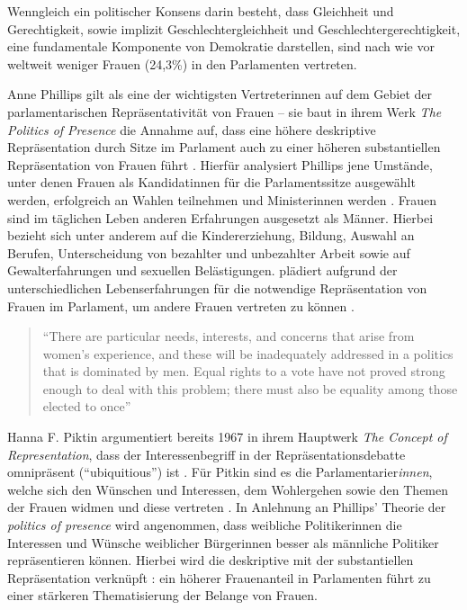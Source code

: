 \documentclass[12pt, 
    twoside=false, 
    bibliography=totoc, 
    numbers=endperiod, 
    headings=normal, 
    toc=chapterentrydotfill
    ]{scrbook}
\begin{document}
Wenngleich ein politischer Konsens darin besteht, dass Gleichheit und Gerechtigkeit, sowie implizit Geschlechtergleichheit und Geschlechtergerechtigkeit, eine fundamentale Komponente von Demokratie darstellen, sind nach wie vor weltweit weniger Frauen (24,3\%) \parencite[]{ipu_2019} in den Parlamenten vertreten.

Anne Phillips gilt als eine der wichtigsten Vertreterinnen auf dem Gebiet der parlamentarischen Repräsentativität von Frauen -- sie baut in ihrem Werk \emph{The Politics of Presence} \parencite*{phillips_1998} die Annahme auf, dass eine höhere deskriptive Repräsentation durch Sitze im Parlament auch zu einer höheren substantiellen Repräsentation von Frauen führt \parencite[52]{wangnerud_2009}. Hierfür analysiert Phillips jene Umstände, unter denen Frauen als Kandidatinnen für die Parlamentssitze ausgewählt werden, erfolgreich an Wahlen teilnehmen und Ministerinnen werden \parencite[vgl.][416f.]{blaxill_2016}. Frauen sind im täglichen Leben anderen Erfahrungen ausgesetzt als Männer. Hierbei bezieht sich \textcite{phillips_1998} unter anderem auf die Kindererziehung, Bildung, Auswahl an Berufen, Unterscheidung von bezahlter und unbezahlter Arbeit sowie auf Gewalterfahrungen und sexuellen Belästigungen. \textcite{phillips_1998} plädiert aufgrund der unterschiedlichen Lebenserfahrungen für die notwendige Repräsentation von Frauen im Parlament, um andere Frauen vertreten zu können \parencite[vgl.][52]{wangnerud_2009}.

\citereset
\begin{quote}
    \enquote{There are particular needs, interests, and concerns that arise from women's experience, and these will be inadequately addressed in a politics that is dominated by men. Equal rights to a vote have not proved strong enough to deal with this problem; there must also be equality among those elected to once} \parencite[66]{phillips_1998}
\end{quote}

Hanna F. Piktin \parencite*{pitkin_1972} argumentiert bereits 1967 in ihrem Hauptwerk \emph{The Concept of Representation}, dass der Interessenbegriff in der Repräsentationsdebatte omnipräsent (\enquote{ubiquitious}) ist \parencite[69]{wangnerud_2000}. Für Pitkin sind es die Parlamentarier\emph{innen}, welche sich den Wünschen und Interessen, dem Wohlergehen sowie den Themen der Frauen widmen und diese vertreten \parencites[vgl.][413]{blaxill_2016}{pitkin_1972}. In Anlehnung an Phillips' Theorie der \emph{politics of presence} \parencite*{phillips_1998} wird angenommen, dass weibliche Politikerinnen die Interessen und Wünsche weiblicher Bürgerinnen besser als männliche Politiker repräsentieren können. Hierbei wird die deskriptive mit der substantiellen Repräsentation verknüpft \parencite[52]{wangnerud_2009}: ein höherer Frauenanteil in Parlamenten führt zu einer stärkeren Thematisierung der Belange von Frauen.
\end{document}

